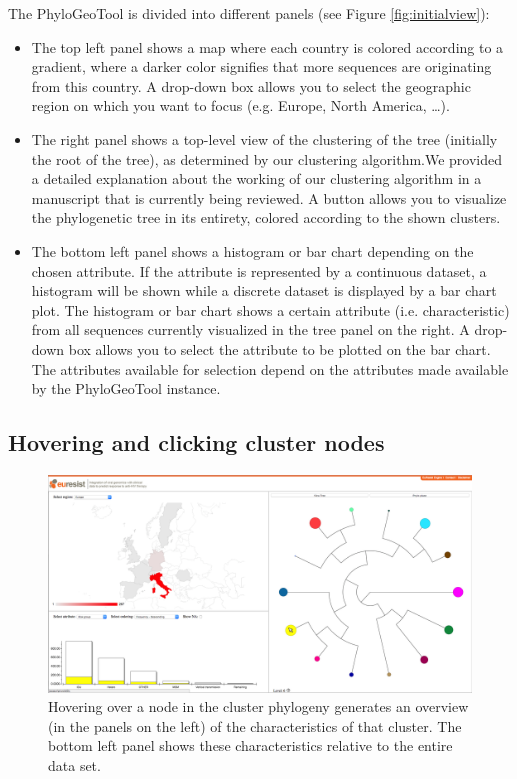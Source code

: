 \documentclass[a4paper, 11pt]{article} %
\begin{document}
The PhyloGeoTool is divided into different panels (see Figure \ref{fig:initialview}): 
\begin{itemize}
  \item The top left panel shows a map where each country is colored according to a gradient, where a darker color signifies that more sequences are originating from this country. 
    A drop-down box allows you to select the geographic region on which you want to focus (e.g. Europe, North America, \ldots).
  \item The right panel shows a top-level view of the clustering of the tree (initially the root of the tree), as determined by our clustering algorithm.We provided a detailed explanation about the working of our clustering algorithm in a manuscript that is currently being reviewed. %
A button allows you to visualize the phylogenetic tree in its entirety, colored according to the shown clusters.
  \item The bottom left panel shows a histogram or bar chart depending on the chosen attribute. If the attribute is represented by a continuous dataset, a histogram will be shown while a discrete dataset is displayed by a bar chart plot.
  The histogram or bar chart shows a certain attribute (i.e. characteristic) from all sequences currently visualized in the tree panel on the right. 
  A drop-down box allows you to select the attribute to be plotted on the bar chart. 
  The attributes available for selection depend on the attributes made available by the PhyloGeoTool instance.
\end{itemize}


\subsection{Hovering and clicking cluster nodes}
\begin{figure}[H]
\centering
\includegraphics[scale=0.1875]{images/hover_node.PNG}
\vspace{-0.75cm}
\caption{Hovering over a node in the cluster phylogeny generates an overview (in the panels on the left) of the characteristics of that cluster. The bottom left panel shows these characteristics relative to the entire data set.}
\label{fig:hovernode}
\end{figure}
\end{document}
